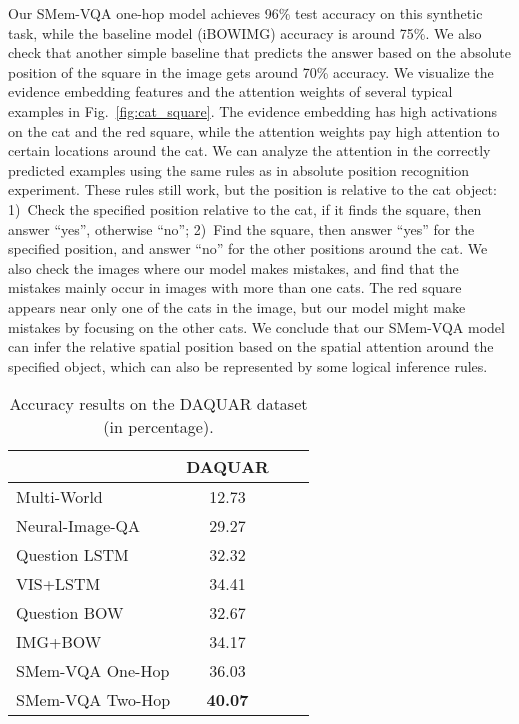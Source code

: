 Our SMem-VQA one-hop model achieves 96\% test accuracy on this synthetic task, while the baseline model (iBOWIMG) accuracy is around 75\%.
We also check that another simple baseline that predicts the answer based on the absolute position of the square in the image gets around 70\% accuracy. 
We visualize the evidence embedding  features and the attention weights  of several typical examples in Fig.~\ref{fig:cat_square}.
The evidence embedding  has high activations on the cat and the red square, while the attention weights pay high attention to certain locations around the cat.
We can analyze the attention in the correctly predicted examples using the same rules as in absolute position recognition experiment. 
These rules still work, but the position is relative to the cat object:
1)~Check the specified position relative to the cat, if it finds the square, then answer ``yes'', otherwise ``no''; 2)~Find the square, then answer ``yes'' for the specified position, and answer ``no'' for the other positions around the cat.
We also check the images where our model makes mistakes, and find that the mistakes mainly occur in images with more than one cats. The red square appears near only one of the cats in the image, but our model might make mistakes by focusing on the other cats.
We conclude that our SMem-VQA model can infer the relative spatial position based on the spatial attention around the specified object, which can also be represented by some logical inference rules. 



\begin{table}[!t]
\centering
\caption{Accuracy results on the DAQUAR dataset (in percentage).}
\small
 \begin{tabular}{l || c c c} 
 \hline
 ~ & DAQUAR\\ \hline
 Multi-World~\cite{DBLP:journals/corr/MalinowskiF14} & 12.73 \\ Neural-Image-QA~\cite{malinowski2015ask} & 29.27  \\ Question LSTM~\cite{malinowski2015ask} & 32.32 \\ VIS+LSTM~\cite{DBLP:journals/corr/RenKZ15} & 34.41 \\ Question BOW~\cite{DBLP:journals/corr/RenKZ15} & 32.67 \\ IMG+BOW~\cite{DBLP:journals/corr/RenKZ15} & 34.17 \\ \hline
SMem-VQA One-Hop & 36.03 \\ SMem-VQA Two-Hop & \bf{40.07} \\ \hline 
\end{tabular}
\label{fig:baseline}
\vspace{-0.2in}
\end{table}


